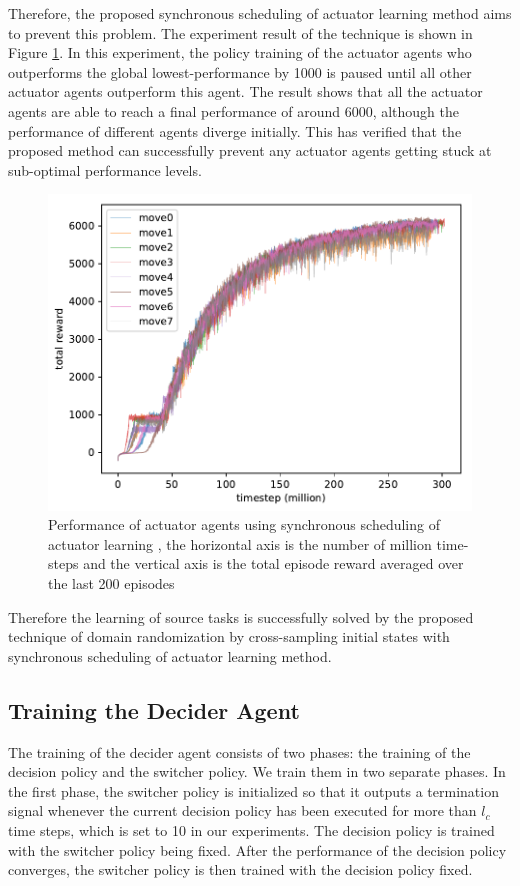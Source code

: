 Therefore, the proposed synchronous scheduling of actuator learning method aims to prevent this problem. The experiment result of the technique is shown in Figure \ref{rec_sync_training}. In this experiment, the policy training of the actuator agents who outperforms the global lowest-performance by 1000 is paused until all other actuator agents outperform this agent. The result shows that all the actuator agents are able to reach a final performance of around 6000, although the performance of different agents diverge initially. This has verified that the proposed method can successfully prevent any actuator agents getting stuck at sub-optimal performance levels. 

\begin{figure}[!htbp]
	\includegraphics[width=\textwidth]{images/rec_180619_sync.pdf}
	\centering
	\caption{Performance of actuator agents using synchronous scheduling of actuator learning , the horizontal axis is the number of million time-steps and the vertical axis is the total episode reward averaged over the last 200 episodes}\label{rec_sync_training}
\end{figure}

Therefore the learning of source tasks is successfully solved by the proposed technique of domain randomization by cross-sampling initial states with synchronous scheduling of actuator learning method.
\subsection{Training the Decider Agent}
The training of the decider agent consists of two phases: the training of the decision policy and the switcher policy. We train them in two separate phases. In the first phase, the switcher policy is initialized so that it outputs a termination signal whenever the current decision policy has been executed for more than $l_c$ time steps, which is set to 10 in our experiments. The decision policy is trained with the switcher policy being fixed. After the performance of the decision policy converges, the switcher policy is then trained with the decision policy fixed.

